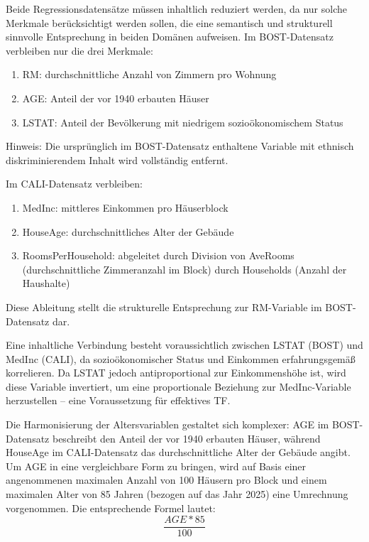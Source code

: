 Beide Regressionsdatensätze müssen inhaltlich reduziert werden, da nur solche Merkmale berücksichtigt werden sollen, die eine semantisch und 
strukturell sinnvolle Entsprechung in beiden Domänen aufweisen. Im BOST-Datensatz verbleiben nur die drei Merkmale:

\begin{enumerate}
    \item RM: durchschnittliche Anzahl von Zimmern pro Wohnung
    \item AGE: Anteil der vor 1940 erbauten Häuser
    \item LSTAT: Anteil der Bevölkerung mit niedrigem sozioökonomischem Status
\end{enumerate}

Hinweis: Die ursprünglich im BOST-Datensatz enthaltene Variable mit ethnisch diskriminierendem Inhalt wird vollständig entfernt.

Im CALI-Datensatz verbleiben:
\begin{enumerate}
    \item MedInc: mittleres Einkommen pro Häuserblock
    \item HouseAge: durchschnittliches Alter der Gebäude
    \item RoomsPerHousehold: abgeleitet durch Division von AveRooms (durchschnittliche Zimmeranzahl im Block) durch Households (Anzahl der Haushalte)
\end{enumerate}

Diese Ableitung stellt die strukturelle Entsprechung zur RM-Variable im BOST-Datensatz dar.

Eine inhaltliche Verbindung besteht voraussichtlich zwischen LSTAT (BOST) und MedInc (CALI), da sozioökonomischer Status und Einkommen 
erfahrungsgemäß korrelieren. Da LSTAT jedoch antiproportional zur Einkommenshöhe ist, wird diese Variable invertiert, um eine proportionale 
Beziehung zur MedInc-Variable herzustellen – eine Voraussetzung für effektives TF.

Die Harmonisierung der Altersvariablen gestaltet sich komplexer: AGE im BOST-Datensatz beschreibt den Anteil der vor 1940 erbauten Häuser, 
während HouseAge im CALI-Datensatz das durchschnittliche Alter der Gebäude angibt. Um AGE in eine vergleichbare Form zu bringen, wird auf 
Basis einer angenommenen maximalen Anzahl von 100 Häusern pro Block und einem maximalen Alter von 85 Jahren (bezogen auf das Jahr 2025) eine 
Umrechnung vorgenommen. Die entsprechende Formel lautet:
\begin{equation}
    \frac{AGE * 85}{100}
\end{equation}

